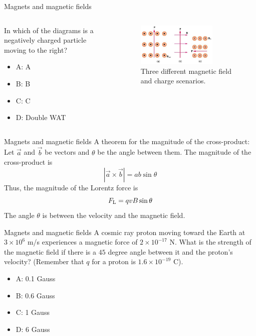 \documentclass{beamer}
\begin{document}
\begin{frame}{Magnets and magnetic fields}
\begin{columns}[T]
\begin{column}{0.3\textwidth}
In which of the diagrams is a negatively charged particle moving to the right?
\begin{itemize}
\item A: A
\item B: B
\item C: C
\item D: Double WAT
\end{itemize}
\end{column}
\begin{column}{0.7\textwidth}
\begin{figure}
\centering
\includegraphics[width=0.75\textwidth]{figures/lorentzProblem.png}
\caption{\label{fig:lorentzProblem5} Three different magnetic field and charge scenarios.}
\end{figure}
\end{column}
\end{columns}
\end{frame}

\begin{frame}{Magnets and magnetic fields}
A theorem for the magnitude of the cross-product:  Let $\vec{a}$ and $\vec{b}$ be vectors and $\theta$ be the angle between them.  The magnitude of the cross-product is
\begin{equation}
|\vec{a} \times \vec{b}| =  a b \sin\theta
\end{equation}
Thus, the magnitude of the Lorentz force is
\begin{equation}
F_{\rm L} = q v B \sin\theta
\end{equation}
The angle $\theta$ is between the velocity and the magnetic field.
\end{frame}

\begin{frame}{Magnets and magnetic fields}
A cosmic ray proton moving toward the Earth at $3 \times 10^{6}$ m/s experiences a magnetic force of $2 \times 10^{-17}$ N. What is the strength of the magnetic field if there is a $45$ degree angle between it and the proton’s velocity?  (Remember that $q$ for a proton is $1.6 \times 10^{-19}$ C).
\begin{itemize}
\item A: 0.1 Gauss
\item B: 0.6 Gauss
\item C: 1 Gauss
\item D: 6 Gauss
\end{itemize}
\end{frame}
\end{document}
